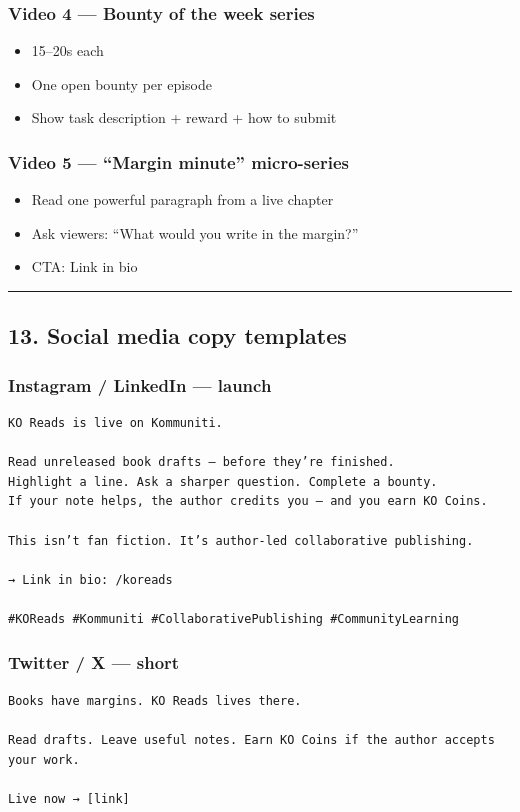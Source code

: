 \documentclass[11pt,a4paper]{report}
\begin{document}
\subsubsection{Video 4 --- Bounty of the week series}
\begin{itemize}
  \item 15--20s each
  \item One open bounty per episode
  \item Show task description + reward + how to submit
\end{itemize}

\subsubsection{Video 5 --- “Margin minute” micro-series}
\begin{itemize}
  \item Read one powerful paragraph from a live chapter
  \item Ask viewers: “What would you write in the margin?”
  \item CTA: Link in bio
\end{itemize}

\medskip\hrule\medskip

\subsection{13. Social media copy templates}

\subsubsection{Instagram / LinkedIn --- launch}
\begin{verbatim}
KO Reads is live on Kommuniti.

Read unreleased book drafts — before they’re finished.
Highlight a line. Ask a sharper question. Complete a bounty.
If your note helps, the author credits you — and you earn KO Coins.

This isn’t fan fiction. It’s author-led collaborative publishing.

→ Link in bio: /koreads

#KOReads #Kommuniti #CollaborativePublishing #CommunityLearning
\end{verbatim}

\subsubsection{Twitter / X --- short}
\begin{verbatim}
Books have margins. KO Reads lives there.

Read drafts. Leave useful notes. Earn KO Coins if the author accepts your work.

Live now → [link]
\end{verbatim}
\end{document}
